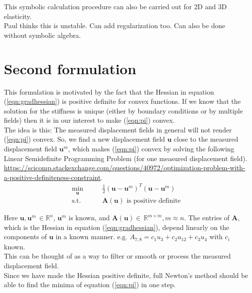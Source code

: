 \documentclass{article}
\begin{document}
This symbolic calculation procedure can also be carried out for 2D and 3D elasticity.\\
%
%
Paul thinks this is unstable. Can add regularization too. Can also be done without symbolic algebra.
%
%
\section{Second formulation}
This formulation is motivated by the fact that the Hessian in equation (\ref{eqn:gradhessian}) is positive definite for convex functions. If we know that the solution for the stiffness is unique (either by boundary conditions or by multiple fields) then it is in our interest to make (\ref{eqn:pi}) convex.\\

The idea is this: The measured displacement fields in general will not render (\ref{eqn:pi}) convex. So, we find a new displacement field $\pmb{u}$ close to the measured displacement field $\pmb{u}^m$, which makes (\ref{eqn:pi}) convex by solving the following Linear Semidefinite Programming Problem (for one measured displacement field). \url{https://scicomp.stackexchange.com/questions/40972/optimization-problem-with-a-positive-definiteness-constraint}.\\


\begin{align}
\min_{\pmb{u}} & \qquad \frac{1}{2}(\pmb{u}-\pmb{u}^m)^{T}(\pmb{u}-\pmb{u}^m)\\
\textrm{s.t.}  & \qquad \pmb{A}(\pmb{u}) \textrm{ is positive definite}
\end{align}

Here $\pmb{u},\pmb{u}^m\,\in\mathbb{R}^n$, $\pmb{u}^m$  is known, and $\pmb{A}(\pmb{u})\in\,\mathbb{R}^{m\times{m}}, m\approx{n}$. The entries of $\pmb{A}$, which is the Hessian in equation (\ref{eqn:gradhessian}),  depend linearly on the components of $\pmb{u}$ in a known manner. e.g. ${A}_{7,8}=c_1u_3 + c_2u_{12} + c_3u_{4}$ with $c_i$ known.\\

This can be thought of as a way to filter or smooth or process the measured displacement field.\\

Since we have made the Hessian positive definite, full Newton's method should be able to find the minima of equation (\ref{eqn:pi}) in one step.
\end{document}
